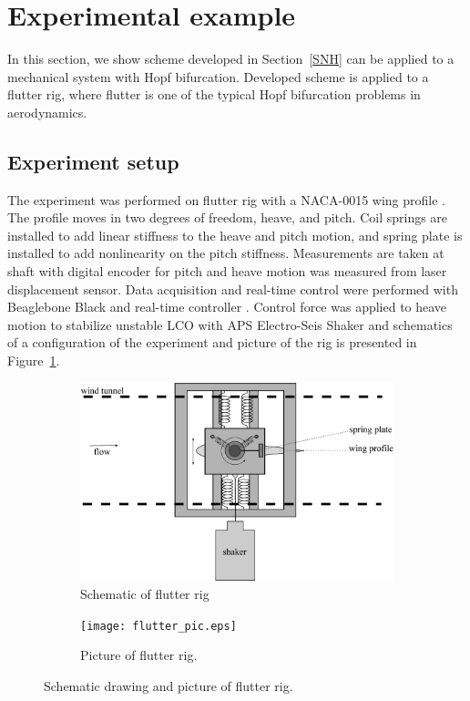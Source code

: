 \documentclass[openacc]{rsproca_new}%
\newcommand{\Sref}[1]{Section~\ref{#1}}
\newcommand{\Fref}[1]{Figure~\ref{#1}}
\begin{document}
\section{Experimental example}
In this section, we show scheme developed in \Sref{SNH} can be applied to a mechanical system with Hopf bifurcation. Developed scheme is applied to a flutter \cite{dimitriadis2017introduction} rig, where flutter is one of the typical Hopf bifurcation problems in aerodynamics.


\subsection{Experiment setup}\label{setup}
The experiment was performed on flutter rig with a NACA-0015 wing profile \cite{jacobs1933characteristics}. The profile moves in two degrees of freedom, heave, and pitch. Coil springs are installed to add linear stiffness to the heave and pitch motion, and spring plate is installed to add nonlinearity on the pitch stiffness. Measurements are taken at shaft with digital encoder for pitch and heave motion was measured from laser displacement sensor. Data acquisition and real-time control were performed with Beaglebone Black and real-time controller \cite{rtc2}. Control force was applied to heave motion to stabilize unstable LCO with APS Electro-Seis Shaker and schematics of a configuration of the experiment and picture of the rig is presented in \Fref{f:rig}.

\begin{figure}
  \centering
  \begin{subfigure}[b]{0.6\linewidth}
    \includegraphics[width=\linewidth]{flutter_rig.eps}
    \caption{Schematic of flutter rig}
  \end{subfigure}
  \begin{subfigure}[b]{0.6\linewidth}
    \texttt{[image: flutter\_pic.eps]}
    \caption{Picture of flutter rig.}
  \end{subfigure}
  \caption{Schematic drawing and picture of flutter rig.}
  \label{f:rig}
\end{figure}
\end{document}
